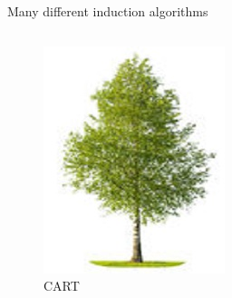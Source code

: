\documentclass[english]{beamer}
\begin{document}
\begin{frame}{Many different induction algorithms}
\begin{columns}
\begin{column}{0.25\textwidth}
\begin{figure}
				\includegraphics[width=\textwidth]{figures/berk.jpg}
				\caption{CART}
			\end{figure}
		\end{column}
		\begin{column}{0.25\textwidth}
			\centering
			\begin{figure}

\end{figure}
\end{column}
\end{columns}
\end{frame}
\end{document}
